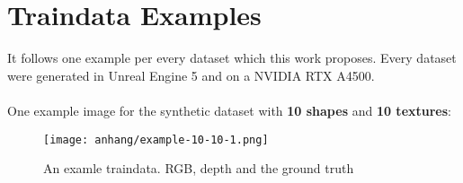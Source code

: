 \chapter{Traindata Examples}
\label{appendix:traindata-examples}

	It follows one example per every dataset which this work proposes. Every dataset were generated in Unreal Engine 5 \cite{ue5} and on a NVIDIA RTX A4500.\\
	\\
	One example image for the synthetic dataset with \textbf{10 shapes} and \textbf{10 textures}:
	\begin{figure}[H]
		\centering
		\texttt{[image: anhang/example-10-10-1.png]}
		\caption[An examle traindata. RGB, depth and the ground truth]{An examle traindata. RGB, depth and the ground truth}
	\end{figure}
	\iffalse
	\begin{figure}[H]
		\centering
		\texttt{[image: anhang/example-10-10-2.png]}
		\caption[An examle traindata. RGB, depth and the ground truth]{An examle traindata. RGB, depth and the ground truth}
	\end{figure}
	\begin{figure}[H]
		\centering
		\texttt{[image: anhang/example-10-10-3.png]}
		\caption[An examle traindata. RGB, depth and the ground truth]{An examle traindata. RGB, depth and the ground truth}
	\end{figure}
	\begin{figure}[H]
		\centering
		\texttt{[image: anhang/example-10-10-4.png]}
		\caption[An examle traindata. RGB, depth and the ground truth]{An examle traindata. RGB, depth and the ground truth}
	\end{figure}
	\begin{figure}[H]
		\centering
		\texttt{[image: anhang/example-10-10-5.png]}
		\caption[An examle traindata. RGB, depth and the ground truth]{An examle traindata. RGB, depth and the ground truth}
	\end{figure}
	\fi
	
